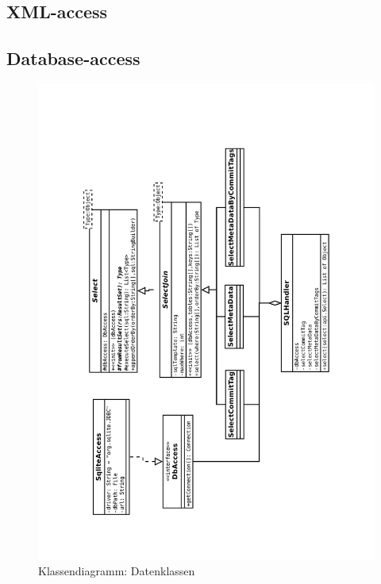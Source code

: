 \subsection{XML-access}
\liable{\cii}
\subsection{Database-access}
\liable{\cii}

\begin{figure}[H]
	\centering
	\label{dia:design:frontend:classes:dbaccess}
	\includegraphics[angle=270, width=1.2\textwidth]{design/frontend/classes/dbaccess-Klassen.pdf}
	\caption{Klassendiagramm: Datenklassen}
\end{figure}

